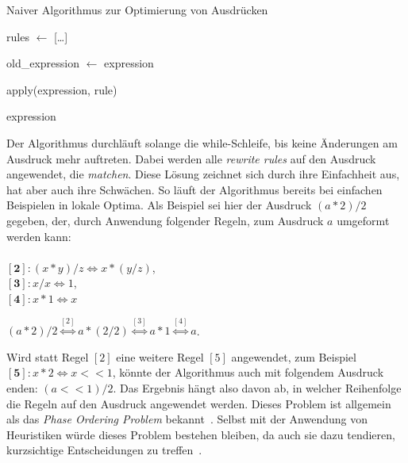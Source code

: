 
\begin{algorithm}[H]
  \caption{Naiver Algorithmus zur Optimierung von Ausdrücken}\label{alg:ausdruck1}
  \begin{algorithmic}
    \State rules $\gets$ [\ldots]
    
      \State old\_expression $\gets$ expression

        \State apply(expression, rule)
        \EndIf
      \EndFor
    \EndWhile

    \State \Return expression
    \EndFunction
  \end{algorithmic}
\end{algorithm}

Der Algorithmus durchläuft solange die while-Schleife, bis keine Änderungen am Ausdruck mehr auftreten.
Dabei werden alle \textit{rewrite rules} auf den Ausdruck angewendet, die \textit{matchen}.
Diese Lösung zeichnet sich durch ihre Einfachheit aus, hat aber auch ihre Schwächen. So läuft der Algorithmus
bereits bei einfachen Beispielen in lokale Optima.
Als Beispiel sei hier der Ausdruck $(a * 2) / 2$ gegeben, der, durch Anwendung folgender Regeln, zum Ausdruck $a$ umgeformt werden kann: \\ \\
$[\mathbf{2}]: (x * y) / z \Leftrightarrow x * (y / z)$, \\
$[\mathbf{3}]:x / x \Leftrightarrow 1$, \\
$[\mathbf{4}]:x * 1 \Leftrightarrow x$ 

$(a * 2) / 2 \overset{[2]}{\Leftrightarrow} a * (2 / 2) \overset{[3]}{\Leftrightarrow} a * 1 \overset{[4]}{\Leftrightarrow} a$.

Wird statt Regel $[2]$ eine weitere Regel $[5]$ angewendet, zum Beispiel $[\mathbf{5}]: x * 2 \Leftrightarrow x << 1$, könnte der Algorithmus auch mit folgendem Ausdruck enden: $(a << 1) / 2$.
Das Ergebnis hängt also davon ab, in welcher Reihenfolge die Regeln auf den Ausdruck angewendet werden. 
Dieses Problem ist allgemein als das \textit{Phase Ordering Problem} bekannt~\cite{phaseorder-2009}.
Selbst mit der Anwendung von Heuristiken würde dieses Problem bestehen bleiben, da auch sie dazu tendieren, kurzsichtige Entscheidungen zu treffen~\cite{phaseorder-2009}.

